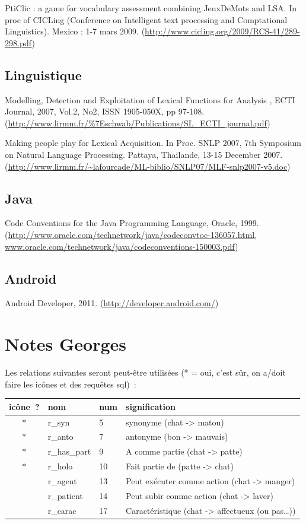 \documentclass[a4paper,11pt,french]{article}
\def\android{Android\texttrademark{}}
\begin{document}
PtiClic : a game for vocabulary assessment combining JeuxDeMots and LSA. In proc of CICLing (Conference on Intelligent text processing and Comptational Linguistics). Mexico : 1-7 mars 2009. (\url{http://www.cicling.org/2009/RCS-41/289-298.pdf})


\subsection{Linguistique}

Modelling, Detection and Exploitation of Lexical Functions for Analysis , ECTI Journal, 2007, Vol.2, No2, ISSN 1905-050X, pp 97-108. (\url{http://www.lirmm.fr/\%7Eschwab/Publications/SL_ECTI_journal.pdf})

Making people play for Lexical Acquisition. In Proc. SNLP 2007, 7th Symposium on Natural Language Processing. Pattaya, Thailande, 13-15 December 2007. (\url{http://www.lirmm.fr/~lafourcade/ML-biblio/SNLP07/MLF-snlp2007-v5.doc})


\subsection{Java}

Code Conventions for the Java Programming Language, Oracle, 1999. (\url{http://www.oracle.com/technetwork/java/codeconvtoc-136057.html, www.oracle.com/technetwork/java/codeconventions-150003.pdf})

\subsection{\android{}}

Android Developer, 2011. (\url{http://developer.android.com/})




\section{Notes Georges}
Les relations suivantes seront peut-être utilisées (* = oui, c'est sûr, on a/doit faire les icônes et des requêtes sql)~:

\begin{tabular}{|c|l|l|l|}
\hline
icône~? & nom & num & signification \\
\hline
$*$ & r\_syn       & 5  & synonyme (chat -> matou) \\
$*$ & r\_anto      & 7  & antonyme (bon -> mauvais) \\
$*$ & r\_has\_part & 9  & A comme partie (chat -> patte) \\
$*$ & r\_holo      & 10 & Fait partie de (patte -> chat) \\
    & r\_agent     & 13 & Peut exécuter comme action (chat -> manger) \\
    & r\_patient   & 14 & Peut subir comme action (chat -> laver) \\
    & r\_carac     & 17 & Caractéristique (chat -> affectueux (ou pas…)) \\
\hline
\end{tabular}
\end{document}
